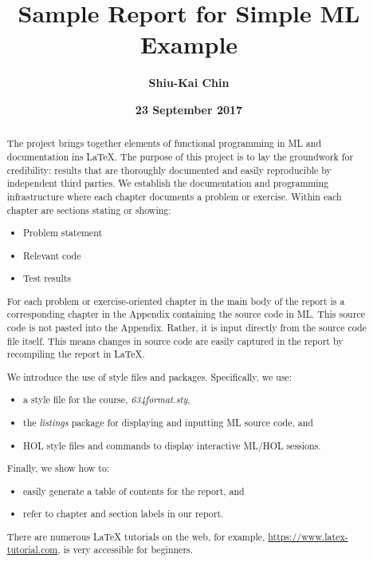 \documentclass{report}
\title{Sample Report for Simple ML Example}
\author{\textbf{Shiu-Kai Chin}}
\date{\textbf{23 September 2017}}
\begin{document}
\lstset{language=ML}


\maketitle{}

\begin{abstract}
  The project brings together elements of functional programming in ML
  and documentation ins \LaTeX{}.  The purpose of this project is to
  lay the groundwork for credibility: results that are thoroughly
  documented and easily reproducible by independent third parties. We
  establish the documentation and programming infrastructure where
  each chapter documents a problem or exercise.  Within each chapter
  are sections stating or showing:
  \begin{itemize}
  \item Problem statement
  \item Relevant code
  \item Test results 
  \end{itemize}
  
  For each problem or exercise-oriented chapter in the main body of
  the report is a corresponding chapter in the Appendix containing the
  source code in ML.  This source code is not pasted into the
  Appendix.  Rather, it is input directly from the source code file
  itself. This means changes in source code are easily captured in the
  report by recompiling the report in \LaTeX{}.

  We introduce the use of style files and packages. Specifically, we use:
  \begin{itemize}
  \item a style file for the course, \emph{634format.sty}, 
  \item the \emph{listings} package for displaying and inputting ML
    source code, and
  \item HOL style files and commands to display interactive ML/HOL
    sessions.
  \end{itemize}

  Finally, we show how to:
  \begin{itemize}
  \item easily generate a table of contents for the report, and
  \item refer to chapter and section labels in our report.
  \end{itemize}

  There are numerous \LaTeX{} tutorials on the web, for example,
  \url{https://www.latex-tutorial.com}, is very accessible for
  beginners.

\end{abstract}
\end{document}
